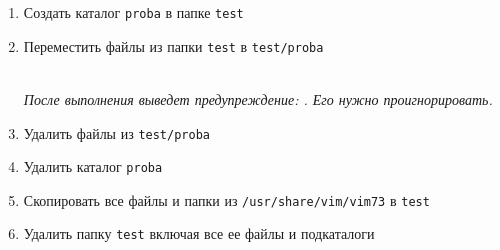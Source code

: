 \documentclass[a4paper,12pt]{article}
\begin{document}
\begin{flushleft}
\begin{enumerate}
\begin{enumerate} [\bf a. ]
\begin{flushleft}
                \end{flushleft}
                \item Создать каталог \texttt{proba} в папке \texttt{test}
                \begin{flushleft}
                \end{flushleft}
                \item Переместить файлы из папки \texttt{test} в \texttt{test/proba}
                \begin{flushleft}
                    \\
                    \textit{После выполнения выведет предупреждение: . Его нужно проигнорировать.}
                \end{flushleft}
                \item Удалить файлы из \texttt{test/proba}
                \begin{flushleft}
                \end{flushleft}
                \item Удалить каталог \texttt{proba}
                \begin{flushleft}
                \end{flushleft}
                \item Скопировать все файлы и папки из \texttt{/usr/share/vim/vim73} в \texttt{test}
                \begin{flushleft}
                \end{flushleft}
                \item Удалить папку \texttt{test} включая все ее файлы и подкаталоги
                \begin{flushleft}
                \end{flushleft}
            \end{enumerate}
        \end{enumerate}
    \end{flushleft}
\end{document}
